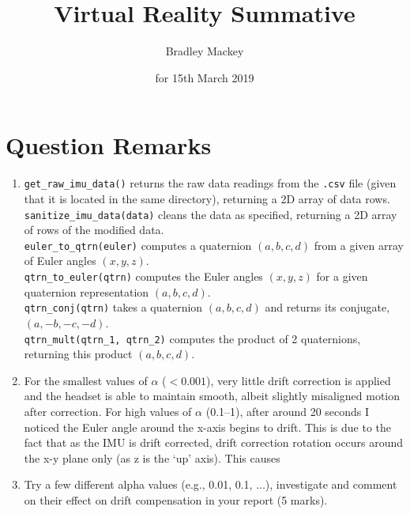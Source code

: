 \documentclass[11pt]{article}
\makeatletter
\newcommand{\skipitems}[1]{%
  \addtocounter{\@enumctr}{#1}%
}
\makeatother
\begin{document}
\title{\textbf{Virtual Reality Summative}}
\date{for 15th March 2019}
\author{Bradley Mackey}
\maketitle


\section*{Question Remarks}

\begin{enumerate}
\item 
\texttt{get\_raw\_imu\_data()} returns the raw data readings from the \texttt{.csv} file (given that it is located in the same directory), returning a 2D array of data rows.\\
\texttt{sanitize\_imu\_data(data)} cleans the data as specified, returning a 2D array of rows of the modified data.\\
\texttt{euler\_to\_qtrn(euler)} computes a quaternion $(a,b,c,d)$ from a given array of Euler angles $(x,y,z)$.\\
\texttt{qtrn\_to\_euler(qtrn)} computes the Euler angles $(x,y,z)$ for a given quaternion representation $(a,b,c,d)$.\\
\texttt{qtrn\_conj(qtrn)} takes a quaternion $(a,b,c,d)$ and returns its conjugate, $(a,-b,-c,-d)$.\\
\texttt{qtrn\_mult(qtrn\_1, qtrn\_2)} computes the product of 2 quaternions, returning this product $(a,b,c,d)$.

\skipitems{1} 


\item For the smallest values of $\alpha$ ($<0.001$), very little drift correction is applied and the headset is able to maintain smooth, albeit slightly misaligned motion after correction. For high values of $\alpha$ (0.1--1), after around 20 seconds I noticed the Euler angle around the x-axis begins to drift. This is due to the fact that as the IMU is drift corrected, drift correction rotation occurs around the x-y plane only (as z is the `up' axis). This causes 


\item Try a few different alpha values (e.g., 0.01, 0.1, ...), investigate and comment on their effect on drift compensation in your report (5 marks).
\end{enumerate}
\end{document}
